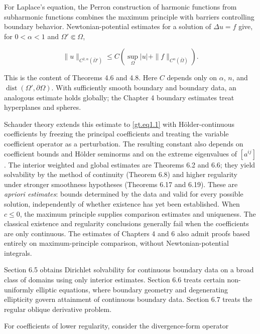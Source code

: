 For Laplace's equation, the Perron construction of harmonic functions from
subharmonic functions combines the maximum principle with barriers controlling
boundary behavior. Newtonian-potential estimates for a solution of
$\Delta u=f$ give, for $0<\alpha<1$ and $\Omega'\Subset\Omega$,

\begin{equation}\label{gt.eq1.5}
\tag{1.3}
\|u\|_{C^{2,\alpha}(\bar{\Omega}')} \leq C\!\left(\sup_{\Omega}|u|+\|f\|_{C^{\alpha}(\bar{\Omega})}\right).
\end{equation}

This is the content of Theorems 4.6 and 4.8. Here $C$ depends only on $\alpha$,
$n$, and $\operatorname{dist}(\Omega',\partial\Omega)$. With sufficiently smooth
boundary and boundary data, an analogous estimate holds globally; the Chapter 4
boundary estimates treat hyperplanes and spheres.

Schauder theory extends this estimate to \eqref{gt.eq1.1} with H\"older-continuous
coefficients by freezing the principal coefficients and treating the variable
coefficient operator as a perturbation. The resulting constant also depends on
coefficient bounds and H\"older seminorms and on the extreme eigenvalues of
$[a^{ij}]$. The interior weighted and global estimates are Theorems 6.2 and 6.6;
they yield solvability by the method of continuity (Theorem 6.8) and higher
regularity under stronger smoothness hypotheses (Theorems 6.17 and 6.19).
These are \emph{apriori estimates}: bounds determined by the data and valid for
every possible solution, independently of whether existence has yet been
established. When $c\leq0$, the maximum principle supplies comparison estimates
and uniqueness. The classical existence and regularity conclusions generally
fail when the coefficients are only continuous. The estimates of Chapters 4 and
6 also admit proofs based entirely on maximum-principle comparison, without
Newtonian-potential integrals.

Section 6.5 obtains Dirichlet solvability for continuous boundary data on a broad
class of domains using only interior estimates. Section 6.6 treats certain
non-uniformly elliptic equations, where boundary geometry and degenerating
ellipticity govern attainment of continuous boundary data. Section 6.7 treats the
regular oblique derivative problem.

For coefficients of lower regularity, consider the divergence-form operator

